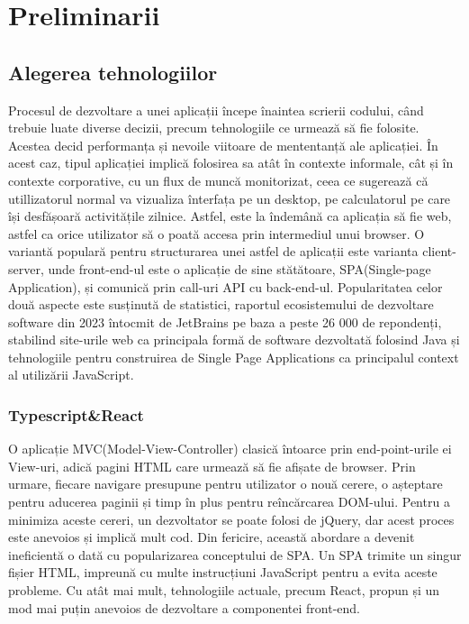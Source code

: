 \chapter{Preliminarii}

\section{Alegerea tehnologiilor}

Procesul de dezvoltare a unei aplicații începe înaintea scrierii codului, când trebuie luate diverse decizii, precum tehnologiile ce urmează să fie folosite. Acestea decid performanța și nevoile viitoare de mententanță ale aplicației. În acest caz, tipul aplicației implică folosirea sa atât în contexte informale, cât și în contexte corporative, cu un flux de muncă monitorizat, ceea ce sugerează că utillizatorul normal va vizualiza înterfața pe un desktop, pe calculatorul pe care își desfășoară activitățile zilnice. Astfel, este la îndemână ca aplicația să fie web, astfel ca orice utilizator să o poată accesa prin intermediul unui browser. O variantă populară pentru structurarea unei astfel de aplicații este varianta client-server, unde front-end-ul este o aplicație de sine stătătoare, SPA(Single-page Application), și comunică prin call-uri API cu back-end-ul. Popularitatea celor două aspecte este susținută de statistici, raportul ecosistemului de dezvoltare software din 2023 întocmit de JetBrains pe baza a peste 26 000 de repondenți, stabilind site-urile web ca principala formă de software dezvoltată folosind Java\cite{java-ecosystem} și tehnologiile pentru construirea de Single Page Applications ca principalul context al utilizării JavaScript\cite{javascript-ecosystem}.

\subsection{Typescript\&React}
O aplicație MVC(Model-View-Controller) clasică întoarce prin end-point-urile ei View-uri, adică pagini HTML care urmează să fie afișate de browser. Prin urmare, fiecare navigare presupune pentru utilizator o nouă cerere, o așteptare pentru aducerea paginii și timp în plus pentru reîncărcarea DOM-ului. Pentru a minimiza aceste cereri, un dezvoltator se poate folosi de jQuery, dar acest proces este anevoios și implică mult cod. Din fericire, această abordare a devenit ineficientă o dată cu popularizarea conceptului de SPA. Un SPA trimite un singur fișier HTML, impreună cu multe instrucțiuni JavaScript pentru a evita aceste probleme. Cu atât mai mult, tehnologiile actuale, precum React, propun și un mod mai puțin anevoios de dezvoltare a componentei front-end.

